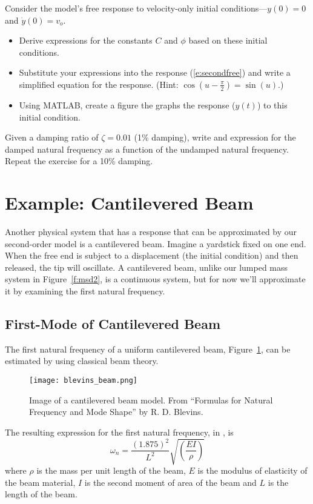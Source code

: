 \begin{ex}
Consider the model's free response to velocity-only initial conditions---$y(0)=0$ and $\dot{y}(0)=v_o$.
\begin{itemize}
\item Derive expressions for the constants $C$ and $\phi$ based on these initial conditions.
\item Substitute your expressions into the response (\ref{e:secondfree}) and write a simplified equation for the response.  (Hint: $\cos\left(u-\frac{\pi}{2}\right) = \sin(u)$.)
\item Using MATLAB, create a figure the graphs the response ($y(t)$) to this initial condition.
\end{itemize}
\end{ex}


\begin{ex}
Given a damping ratio of $\zeta=0.01$ (1\% damping), write and expression for the damped natural frequency as a function of the undamped natural frequency.  \\
Repeat the exercise for a 10\% damping.
\end{ex}

\section{Example: Cantilevered Beam}
Another physical system that has a response that can be approximated by our second-order model is a cantilevered beam.  Imagine a yardstick fixed on one end.  When the free end is subject to a displacement (the initial condition) and then released, the tip will oscillate.  A cantilevered beam, unlike our lumped mass system in Figure~\ref{f:msd2}, is a continuous system, but for now we'll approximate it by examining the first natural frequency.  

\subsection{First-Mode of Cantilevered Beam}
The first natural frequency of a uniform cantilevered beam, Figure~\ref{f:blevins}, can be estimated by using classical beam theory.
\begin{figure}[htb!]
\centerline{
{\texttt{[image: blevins\_beam.png]}}}
\caption{Image of a cantilevered beam model.  From ``Formulas for Natural Frequency and Mode Shape'' by R. D. Blevins.}
\label{f:blevins}
\end{figure}
The resulting expression for the first natural frequency, in , is
\begin{equation}\label{e:blevins}
\omega_n = \frac{(1.875)^2}{L^2} \sqrt{\left( \frac{EI}{\rho} \right)}
\end{equation}
where $\rho$ is the mass per unit length of the beam, $E$ is the modulus of elasticity of the beam material, $I$ is the second moment of area of the beam and $L$ is the length of the beam. 

